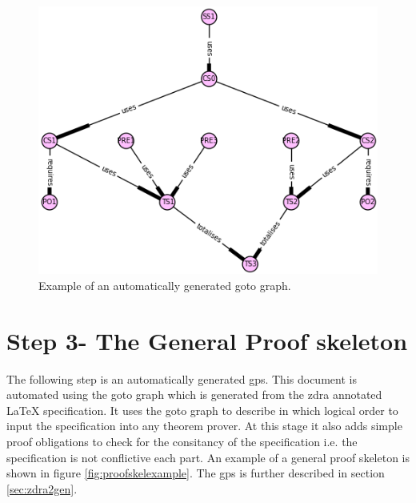 \begin{figure}[H]
 \begin{center}
 \includegraphics [scale=0.4]{Figures/Design/goto.png}
 \caption{Example of an automatically generated goto graph.}
 \label{fig:gotoexample}
\end{center}
\end{figure} 

\section{Step 3- The General Proof skeleton}

The following step is an automatically generated \gls{gps}. This document is automated using the goto graph which is generated from the \gls{zdra} annotated \LaTeX{} specification. It uses the goto graph to describe in which logical order to input the specification into any theorem prover. At this stage it also adds simple proof obligations to check for the consitancy of the specification i.e. the specification is not conflictive each part. An example of a general proof skeleton is shown in figure \ref{fig:proofskelexample}. The \gls{gps} is further described in section \ref{sec:zdra2gen}.

